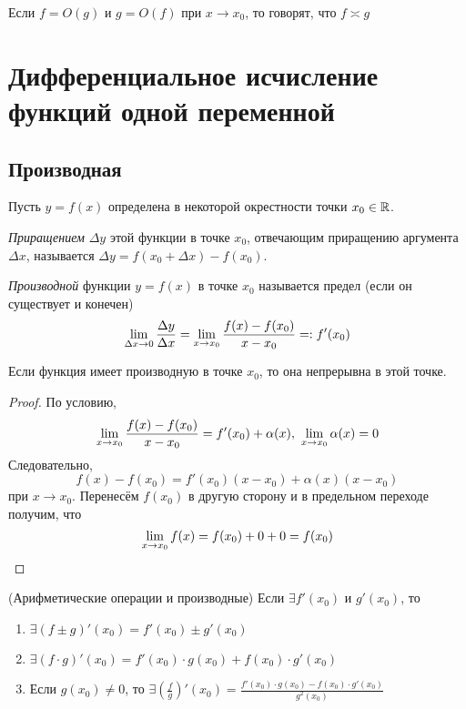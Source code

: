 \begin{definition}
	Если $f = O(g)$ и $g = O(f)$ при $x \to x_0$,
	то говорят, что $f \asymp g$
\end{definition}


\section{Дифференциальное исчисление функций одной переменной}

\subsection{Производная}

\begin{definition}
	Пусть $y = f(x)$ определена в некоторой окрестности
	точки $x_0 \in \mathbb{R}$.
	
	\textit{Приращением} $\Delta y$ этой функции в
	точке $x_0$, отвечающим приращению аргумента
	$\Delta x$, называется $\Delta y = f(x_0 + \Delta x) - f(x_0)$.
	
	\textit{Производной} функции $y = f(x)$ в точке $x_0$ называется предел (если он существует и конечен)
	\[
		\lim\limits_{\Delta x \to 0} \frac{\Delta y}{\Delta x} = \lim\limits_{x \to x_0} \frac{f(x) - f(x_0)}{x - x_0} =: f'(x_0)
	\]
\end{definition}

\begin{theorem} \label{diff_function_to_cont}
	Если функция имеет производную в точке $x_0$,
	то она непрерывна в этой точке.
\end{theorem}

\begin{proof}
	По условию,
	\[
		\lim\limits_{x \to x_0} \frac{f(x) - f(x_0)}{x - x_0} =
		f'(x_0) + \alpha(x),\ \lim\limits_{x \to x_0} \alpha(x) = 0
	\]
	Следовательно,
	\[
		f(x) - f(x_0) = f'(x_0)(x - x_0) + \alpha(x)(x - x_0)
	\]
	при $x \to x_0$. Перенесём $f(x_0)$ в другую сторону
	и в предельном переходе получим, что
	\[
		\lim\limits_{x \to x_0} f(x) = f(x_0) + 0 + 0 = f(x_0)
	\]
\end{proof}

\begin{theorem} (Арифметические операции и производные)
	Если $\exists f'(x_0)$ и $g'(x_0)$, то
	\begin{enumerate}
		\item $\exists (f \pm g)'(x_0) = f'(x_0) \pm g'(x_0)$
		
		\item $\exists (f \cdot g)'(x_0) =
		f'(x_0) \cdot g(x_0) + f(x_0) \cdot g'(x_0)$
		
		\item Если $g(x_0) \neq 0$, то
		$\exists \left(\frac{f}{g}\right)'(x_0) =
		\frac{f'(x_0) \cdot g(x_0) - f(x_0) \cdot g'(x_0)}{g^2(x_0)}$
	\end{enumerate}
\end{theorem}

